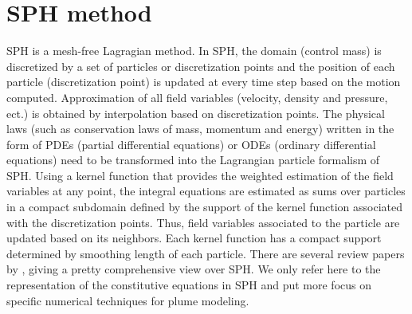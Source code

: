 \documentclass[journal abbreviation, manuscript]{copernicus}
\begin{document}
\section{SPH method} \label{sec:SPH_method}
SPH is a mesh-free Lagragian method. In SPH, the domain (control mass) is discretized by a set of particles or discretization points and the position of each particle (discretization point) is updated at every time step based on the motion computed. Approximation of all field variables (velocity, density and pressure, ect.) is obtained by interpolation based on discretization points. The physical laws (such as conservation laws of mass, momentum and energy) written in the form of PDEs (partial differential equations)  or ODEs (ordinary differential equations) need to be transformed into the Lagrangian particle formalism of SPH. Using a kernel function that provides the weighted estimation of the field variables at any point, the integral equations are estimated as sums over particles in a compact subdomain defined by the support of the kernel function associated with the discretization points. Thus, field variables associated to the particle are updated based on its neighbors. Each kernel function has a compact support determined by smoothing length of each particle. There are several review papers by \citet{monaghan1992smoothed, monaghan2005smoothed, rosswog2009astrophysical, price2012smoothed, monaghan2012smoothed}, giving a pretty comprehensive view over SPH. We only refer here to the representation of the constitutive equations in SPH and put more focus on specific numerical techniques for plume modeling.
\end{document}
